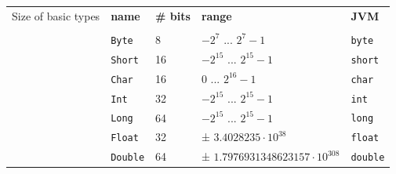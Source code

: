 \documentclass[article, a5paper]{memoir}
\renewcommand{\arraystretch}{0.9}
\begin{document}
{\small \renewcommand{\arraystretch}{1.2}
\begin{tabular}{p{2.8cm}   l l l l}
Size of basic types
& \textbf{name} & \textbf{\# bits} & \textbf{range} & \textbf{JVM}\\ \cline{2-5} %
\\[-1em]
&\texttt{Byte}   &  8  & $-2^7$ ... $2^7-1$   & \texttt{byte} \\
&\texttt{Short}  &  16 & $-2^{15}$ ... $2^{15}-1$ & \texttt{short} \\
&\texttt{Char}   &  16 & $0$ ... $2^{16}-1$ & \texttt{char} \\
&\texttt{Int}    &  32 & $-2^{15}$ ... $2^{15}-1$ & \texttt{int} \\
&\texttt{Long}   &  64 & $-2^{15}$ ... $2^{15}-1$ & \texttt{long} \\
&\texttt{Float}  &  32 & ± $3.4028235 \cdot 10^{38}$  & \texttt{float} \\
&\texttt{Double} &  64 & ± $1.7976931348623157 \cdot 10^{308}$ & \texttt{double} \\
\end{tabular}
}
\end{document}
